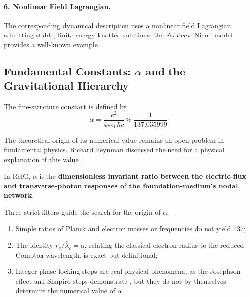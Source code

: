 \documentclass[11pt,a4paper]{article}
\newcommand{\RefG}{\mathrm{RefG}}
\begin{document}
\paragraph{6. Nonlinear Field Lagrangian.} The corresponding dynamical description uses a nonlinear field Lagrangian admitting stable, finite-energy knotted solutions; the Faddeev--Niemi model provides a well-known example \citep{faddeev1997}.

\subsection{Fundamental Constants: \texorpdfstring{$\alpha$}{alpha} and the Gravitational Hierarchy}

The fine-structure constant is defined by
\begin{equation}
\alpha = \frac{e^2}{4\pi \epsilon_0 \hbar c} \approx \frac{1}{137.035999}
\end{equation}

The theoretical origin of its numerical value remains an open problem in fundamental physics. Richard Feynman discussed the need for a physical explanation of this value \citep{feynman1985}.

In $\RefG$, $\alpha$ is the \textbf{dimensionless invariant ratio between the electric-flux and transverse-photon responses of the foundation-medium's nodal network}.

Three strict filters guide the search for the origin of $\alpha$:
\begin{enumerate}[label=\arabic*.]
\item Simple ratios of Planck and electron masses or frequencies do not yield 137;
\item The identity $r_e/\bar{\lambda}_c=\alpha$, relating the classical electron radius to the reduced Compton wavelength, is exact but definitional;
\item Integer phase-locking steps are real physical phenomena, as the Josephson effect and Shapiro steps demonstrate \citep{josephson1962,shapiro1963}, but they do not by themselves determine the numerical value of $\alpha$.
\end{enumerate}
\end{document}

